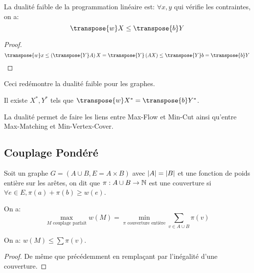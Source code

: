 \documentclass[math, info]{cours}
\begin{document}
\begin{proposition}
	La dualité faible de la programmation linéaire est: $\forall x, y$ qui vérifie les contraintes, on a:
	\begin{equation*}
		\transpose{w}X \leq \transpose{b}Y
	\end{equation*}
	\label{prop:dualitylinearprog}
\end{proposition}
\begin{proof}
	\begin{equation*}
		\transpose{w}x \leq \left(\transpose{Y}A\right)X = \transpose{Y}\left(AX\right) \leq \transpose{Y}b= \transpose{b}Y
	\end{equation*}
\end{proof}

Ceci redémontre la dualité faible pour les graphes.

\begin{thm}
	Il existe $X^{*}, Y^{*}$ tels que $\transpose{w}X^{*} = \transpose{b}Y^{*}$.
\end{thm}
La dualité permet de faire les liens entre Max-Flow et Min-Cut ainsi qu'entre Max-Matching et Min-Vertex-Cover.

\subsection{Couplage Pondéré}
\begin{definition}
	Soit un graphe $G = \left(A\cup B, E = A \times B\right)$ avec $\left|A\right| = \left|B\right|$ et une fonction de poids entière sur les arêtes, on dit que $\pi: A\cup B \to \mathbb{N}$ est une couverture si $\forall e \in E, \pi(a) + \pi(b) \geq w(e)$.
	\label{def:cover}
\end{definition}

\begin{thm}[Egrevary]
	On a:
	\begin{equation*}
		\max_{M \text{ couplage parfait}} w(M) = \min_{\pi \text{ couverture entière}} \sum_{v \in A\cup B} \pi(v)
	\end{equation*}
\end{thm}

\begin{proposition}
	On a: $w(M) \leq \sum \pi(v)$.
	\label{prop:weakduality2}
\end{proposition}
\begin{proof}
	De même que précédemment en remplaçant par l'inégalité d'une couverture.
\end{proof}
\end{document}
